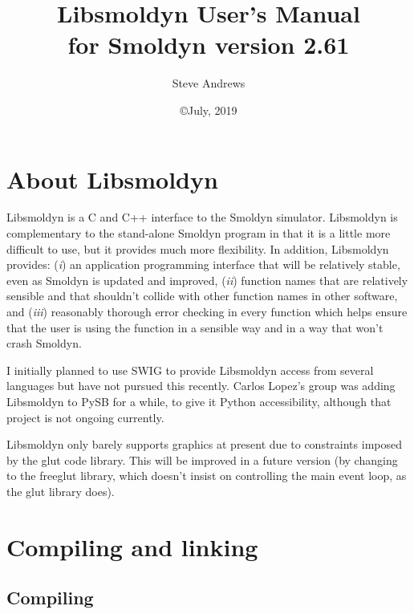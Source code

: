 \documentclass {book}
\begin{document}



\title{\textbf{Libsmoldyn User's Manual} \\ \large for Smoldyn version 2.61}
\date{\copyright July, 2019}
\author{Steve Andrews}
\maketitle

\tableofcontents


\chapter{About Libsmoldyn}
Libsmoldyn is a C and C++ interface to the Smoldyn simulator. Libsmoldyn is complementary to the stand-alone Smoldyn program in that it is a little more difficult to use, but it provides much more flexibility. In addition, Libsmoldyn provides: (\emph{i}) an application programming interface that will be relatively stable, even as Smoldyn is updated and improved, (\emph{ii}) function names that are relatively sensible and that shouldn't collide with other function names in other software, and (\emph{iii}) reasonably thorough error checking in every function which helps ensure that the user is using the function in a sensible way and in a way that won't crash Smoldyn.

I initially planned to use SWIG to provide Libsmoldyn access from several languages but have not pursued this recently. Carlos Lopez's group was adding Libsmoldyn to PySB for a while, to give it Python accessibility, although that project is not ongoing currently.

Libsmoldyn only barely supports graphics at present due to constraints imposed by the glut code library. This will be improved in a future version (by changing to the freeglut library, which doesn't insist on controlling the main event loop, as the glut library does).


\chapter{Compiling and linking}

\section{Compiling}
\end{document}
